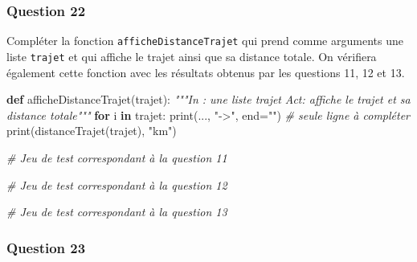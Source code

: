 \documentclass[
  paper=a4,
  ,captions=tableheading
]{scrartcl}
\newenvironment{Shaded}{}{}
\newcommand{\BuiltInTok}[1]{\textcolor[rgb]{0.00,0.50,0.00}{#1}}
\newcommand{\CommentTok}[1]{\textcolor[rgb]{0.38,0.63,0.69}{\textit{#1}}}
\newcommand{\ControlFlowTok}[1]{\textcolor[rgb]{0.00,0.44,0.13}{\textbf{#1}}}
\newcommand{\KeywordTok}[1]{\textcolor[rgb]{0.00,0.44,0.13}{\textbf{#1}}}
\newcommand{\NormalTok}[1]{#1}
\newcommand{\OperatorTok}[1]{\textcolor[rgb]{0.40,0.40,0.40}{#1}}
\newcommand{\StringTok}[1]{\textcolor[rgb]{0.25,0.44,0.63}{#1}}
\begin{document}
\hypertarget{question-22}{%
\subsubsection{Question 22}\label{question-22}}

Compléter la fonction \texttt{afficheDistanceTrajet} qui prend comme
arguments une liste \texttt{trajet} et qui affiche le trajet ainsi que
sa distance totale. On vérifiera également cette fonction avec les
résultats obtenus par les questions 11, 12 et 13.

\begin{Shaded}
\begin{Highlighting}[]
\KeywordTok{def}\NormalTok{ afficheDistanceTrajet(trajet):}
    \CommentTok{"""In : une liste trajet}
\CommentTok{    Act: affiche le trajet et sa distance totale"""}
    \ControlFlowTok{for}\NormalTok{ i }\KeywordTok{in}\NormalTok{ trajet:}
        \BuiltInTok{print}\NormalTok{(..., }\StringTok{"{-}\textgreater{}"}\NormalTok{, end}\OperatorTok{=}\StringTok{""}\NormalTok{)  }\CommentTok{\# seule ligne à compléter}
    \BuiltInTok{print}\NormalTok{(distanceTrajet(trajet), }\StringTok{"km"}\NormalTok{)}
\end{Highlighting}
\end{Shaded}

\begin{Shaded}
\begin{Highlighting}[]
\CommentTok{\# Jeu de test correspondant à la question 11}
\end{Highlighting}
\end{Shaded}

\begin{Shaded}
\begin{Highlighting}[]
\CommentTok{\# Jeu de test correspondant à la question 12}
\end{Highlighting}
\end{Shaded}

\begin{Shaded}
\begin{Highlighting}[]
\CommentTok{\# Jeu de test correspondant à la question 13}
\end{Highlighting}
\end{Shaded}

\hypertarget{question-23}{%
\subsubsection{Question 23}\label{question-23}}
\end{document}
